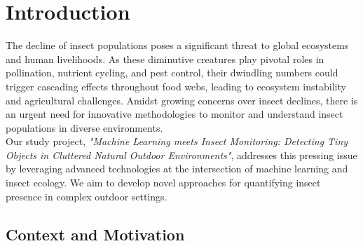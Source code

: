 \documentclass[sigchi,screen]{acmart}
\begin{document}



\maketitle


\section{Introduction}\label{ch01:intro}

The decline of insect populations poses a significant threat to global ecosystems and human livelihoods. As these diminutive creatures play pivotal roles in pollination, nutrient cycling, and pest control, their dwindling numbers could trigger cascading effects throughout food webs, leading to ecosystem instability and agricultural challenges. Amidst growing concerns over insect declines, there is an urgent need for innovative methodologies to monitor and understand insect populations in diverse environments.\\
Our study project, \textit{"Machine Learning meets Insect Monitoring: Detecting Tiny Objects in Cluttered Natural Outdoor Environments"}, addresses this pressing issue by leveraging advanced technologies at the intersection of machine learning and insect ecology. We aim to develop novel approaches for quantifying insect presence in complex outdoor settings.

\subsection{Context and Motivation}
\end{document}

